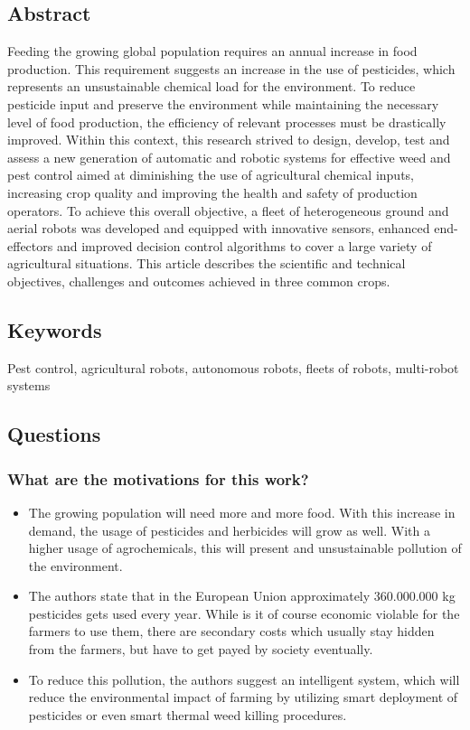 \subsection*{Abstract}
Feeding the growing global population requires an annual increase in food
production. This requirement suggests an increase in the use of pesticides, which represents
an unsustainable chemical load for the environment. To reduce pesticide input and preserve the environment while maintaining the necessary level of food production, the
efficiency of relevant processes must be drastically improved. Within this context, this
research strived to design, develop, test and assess a new generation of automatic and
robotic systems for effective weed and pest control aimed at diminishing the use of
agricultural chemical inputs, increasing crop quality and improving the health and safety of
production operators. To achieve this overall objective, a fleet of heterogeneous ground
and aerial robots was developed and equipped with innovative sensors, enhanced end-effectors and improved decision control algorithms to cover a large variety of agricultural
situations. This article describes the scientific and technical objectives, challenges and
outcomes achieved in three common crops.

\subsection*{Keywords}
Pest control, agricultural robots, autonomous robots, fleets of robots, multi-robot systems


\subsection*{Questions}
\subsubsection*{What are the motivations for this work?}
\begin{itemize}
    \item The growing population will need more and more food. With this increase in demand, the usage of pesticides and herbicides will grow as well. With a higher usage of agrochemicals, this will present and unsustainable pollution of the environment.
    \item The authors state that in the European Union approximately 360.000.000 kg pesticides gets used every year. While is it of course economic violable for the farmers to use them, there are secondary costs which usually stay hidden from the farmers, but have to get payed by society eventually.
    \item To reduce this pollution, the authors suggest an intelligent system, which will reduce the environmental impact of farming by utilizing smart deployment of pesticides or even smart thermal weed killing procedures.
\end{itemize}
